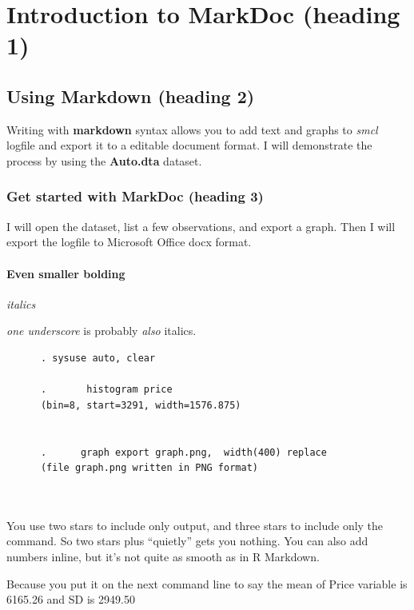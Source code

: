 \documentclass{article}
\begin{document}
\section{Introduction to MarkDoc (heading
1)}\label{introduction-to-markdoc-heading-1}

\subsection{Using Markdown (heading 2)}\label{using-markdown-heading-2}

Writing with \textbf{markdown} syntax allows you to add text and graphs
to \emph{smcl} logfile and export it to a editable document format. I
will demonstrate the process by using the \textbf{Auto.dta} dataset.

\subsubsection{Get started with MarkDoc (heading
3)}\label{get-started-with-markdoc-heading-3}

I will open the dataset, list a few observations, and export a graph.
Then I will export the logfile to Microsoft Office docx format.

\paragraph{Even smaller bolding}\label{even-smaller-bolding}

\emph{italics}

\emph{one underscore} is probably \emph{also} italics.

\begin{verbatim}
      . sysuse auto, clear
      
      .       histogram price
      (bin=8, start=3291, width=1576.875)
      
      
      .      graph export graph.png,  width(400) replace
      (file graph.png written in PNG format)
      
      
\end{verbatim}

You use two stars to include only output, and three stars to include
only the command. So two stars plus ``quietly'' gets you nothing. You
can also add numbers inline, but it's not quite as smooth as in R
Markdown.

Because you put it on the next command line to say the mean of Price
variable is 6165.26 and SD is 2949.50
\end{document}
